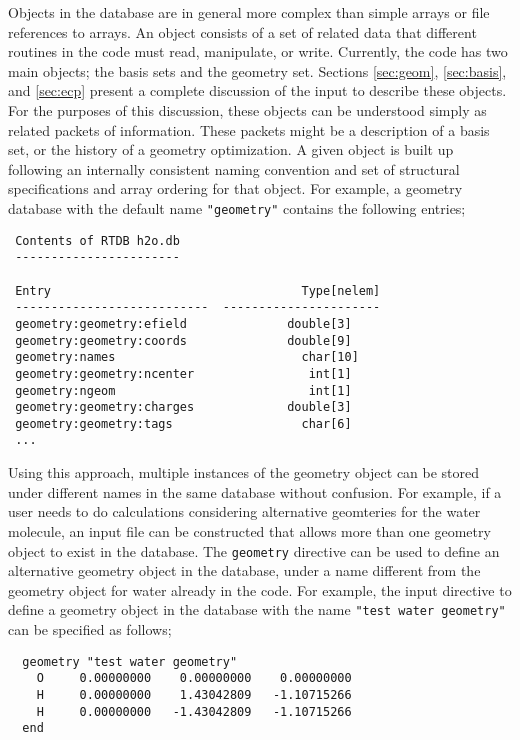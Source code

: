 Objects in the database are in general more complex than simple arrays
or file references to arrays.
An object consists of a set of related data that different routines in
the code must read, manipulate, or write.  Currently, the code has two
main objects; the basis sets and the geometry set.  Sections 
\ref{sec:geom}, \ref{sec:basis}, and \ref{sec:ecp}
present a complete discussion of the input to describe these objects.  For
the purposes of this discussion, these objects can be understood simply
as related packets of information.  These packets might be a description of a
basis set, or the history of a geometry optimization.  A given object is
built up following an internally consistent naming convention and set of 
structural specifications and array ordering for that object. For example, 
a geometry
database with the default name \verb+"geometry"+ contains the following
entries;

\begin{verbatim}
 Contents of RTDB h2o.db
 -----------------------

 Entry                                   Type[nelem]
 ---------------------------  ----------------------
 geometry:geometry:efield              double[3]    
 geometry:geometry:coords              double[9]    
 geometry:names                          char[10]   
 geometry:geometry:ncenter                int[1]    
 geometry:ngeom                           int[1]    
 geometry:geometry:charges             double[3]    
 geometry:geometry:tags                  char[6]
 ...
\end{verbatim}


Using this approach, multiple instances of the geometry object can be 
stored under different names in the same database without confusion.  
For example, if a user needs to do calculations considering alternative
geomteries for the water molecule, an input file can be constructed that
allows more than one geometry object to exist in the database.  The
{\tt geometry} directive can be used to define an alternative geometry
object in the database, under a name different from the geometry object
for water already in the code.  For example, the input directive to define
a geometry object in the database with the name
\verb+"test water geometry"+ can be specified as follows;

\begin{verbatim}
  geometry "test water geometry"
    O     0.00000000    0.00000000    0.00000000
    H     0.00000000    1.43042809   -1.10715266
    H     0.00000000   -1.43042809   -1.10715266
  end
\end{verbatim}

